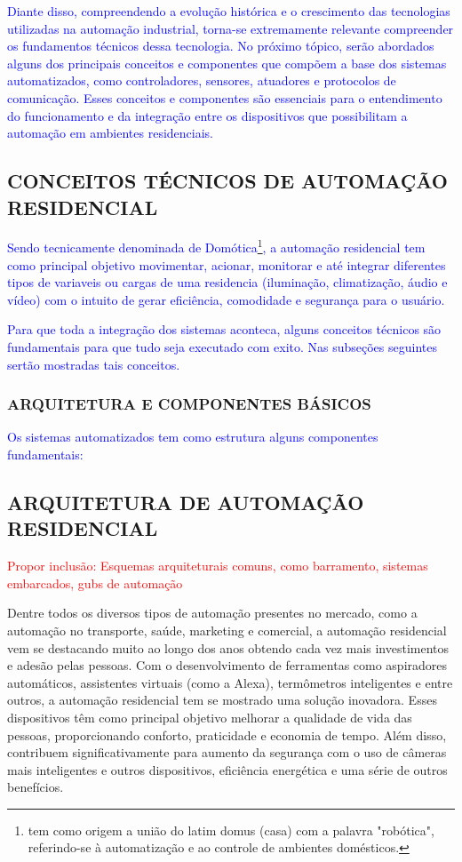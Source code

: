         \textcolor{blue}{Diante disso, compreendendo a evolução histórica e o crescimento das tecnologias utilizadas na automação industrial, torna-se extremamente relevante compreender os fundamentos técnicos dessa tecnologia. No próximo tópico, serão abordados alguns dos principais conceitos e componentes que compõem a base dos sistemas automatizados, como controladores, sensores, atuadores e protocolos de comunicação. Esses conceitos e componentes são essenciais para o entendimento do funcionamento e da integração entre os dispositivos que possibilitam a automação em ambientes residenciais.}


    \subsection{CONCEITOS TÉCNICOS DE AUTOMAÇÃO RESIDENCIAL}
       \textcolor{blue}{Sendo tecnicamente denominada de Domótica\footnote{tem como origem a união do latim domus (casa) com a palavra "robótica", referindo-se à automatização e ao controle de ambientes domésticos.}, a automação residencial tem como principal objetivo movimentar, acionar, monitorar e até integrar diferentes tipos de variaveis ou cargas de uma residencia (iluminação, climatização, áudio e vídeo) com o intuito de gerar eficiência, comodidade e segurança para o usuário.}

       \textcolor{blue}{Para que toda a integração dos sistemas aconteca, alguns conceitos técnicos são fundamentais para que tudo seja executado com exito. Nas subseções seguintes sertão mostradas tais conceitos.}

       \subsubsection{ARQUITETURA E COMPONENTES BÁSICOS}

        \textcolor{blue}{Os sistemas automatizados tem como estrutura alguns componentes fundamentais: }

    \subsection{ARQUITETURA DE AUTOMAÇÃO RESIDENCIAL}

        \textcolor{red}{Propor inclusão: Esquemas arquiteturais comuns, como barramento, sistemas embarcados, gubs de automação}
    
        Dentre todos os diversos tipos de automação presentes no mercado, como a automação no transporte, saúde, marketing e comercial, a automação residencial vem se destacando muito ao longo dos anos obtendo cada vez mais investimentos e adesão pelas pessoas. Com o desenvolvimento de ferramentas como aspiradores automáticos, assistentes virtuais (como a Alexa), termômetros inteligentes e entre outros, a automação residencial tem se mostrado uma solução inovadora. Esses dispositivos têm como principal objetivo melhorar a qualidade de vida das pessoas, proporcionando conforto, praticidade e economia de tempo. Além disso, contribuem significativamente para aumento da segurança com o uso de câmeras mais inteligentes e outros dispositivos, eficiência energética e uma série de outros benefícios\cite{automacaoResidencial}.

